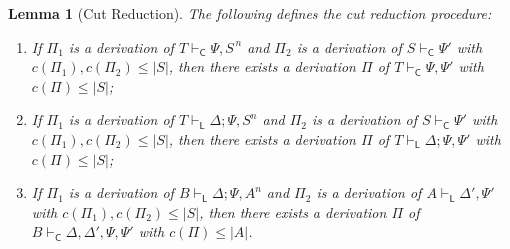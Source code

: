 \documentclass{lmcs}
\newtheorem{lemma}[theorem]{Lemma}
\newcommand{\DualLNLLogicnt}[1]{\mathit{#1}}
\newcommand{\DualLNLLogicmv}[1]{\mathit{#1}}
\newcommand{\DualLNLLogicsym}[1]{#1}
\begin{document}
\begin{lemma}[Cut Reduction]
  \label{lemma:cut_reduction}
  The following defines the cut reduction procedure:
  \begin{enumerate}
  \item If $\Pi_1$ is a derivation of $ \DualLNLLogicnt{T}  \vdash_{\mathsf{C} }  \Psi  \DualLNLLogicsym{,}   \DualLNLLogicnt{S} ^{\, \DualLNLLogicmv{n} }  $ and  $\Pi_2$ is a derivation of $ \DualLNLLogicnt{S}  \vdash_{\mathsf{C} }  \Psi' $ with 
    $c(\Pi_1), c(\Pi_2) \leq |S|$, then there exists a derivation $\Pi$ of $T\vdash_{\mathsf{C}} \Psi, \Psi'$ with $c(\Pi) \leq |S|$;
  \item If $\Pi_1$ is a derivation of $T \vdash_{\mathsf{L}} \Delta; \Psi, S^n$ and  $\Pi_2$ is a derivation of $S \vdash_{\mathsf{C}}\Psi'$ with 
    $c(\Pi_1), c(\Pi_2) \leq |S|$, then there exists a derivation $\Pi$ of $T\vdash_{\mathsf{L}} \Delta; \Psi, \Psi'$ with $c(\Pi) \leq |S|$;
  \item If $\Pi_1$ is a derivation of $B\vdash_{\mathsf{L}} \Delta; \Psi, A^n$ and  $\Pi_2$ is a derivation of $A \vdash_{\mathsf{L}}\Delta', \Psi'$ with $c(\Pi_1), c(\Pi_2) \leq |S|$,
    then there exists a derivation $\Pi$ of $B\vdash_{\mathsf{C}}\Delta, \Delta', \Psi, \Psi'$ with $c(\Pi) \leq |A|$.
  \end{enumerate}
\end{lemma}
\end{document}
